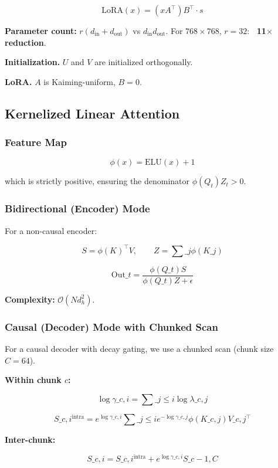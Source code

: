 \[
\text{LoRA}(x) = (x A^\top) B^\top \cdot s
\tag{4.2}
\]

\textbf{Parameter count:} $r(d_\text{in} + d_\text{out})$ vs $d_\text{in} d_\text{out}$. 
For $768 \times 768$, $r = 32$: \textbf{~11$\times$ reduction}.

\textbf{Initialization.} $U$ and $V$ are initialized orthogonally.

\textbf{LoRA.} $A$ is Kaiming-uniform, $B = 0$.

\subsection{Kernelized Linear Attention}

\subsubsection{Feature Map}

\[
\phi(x) = \text{ELU}(x) + 1
\tag{4.3}
\]

which is strictly positive, ensuring the denominator $\phi(Q_t) Z_t > 0$.

\subsubsection{Bidirectional (Encoder) Mode}

For a non-causal encoder:

\[
S = \phi(K)^\top V, \qquad
Z = \sum\_j \phi(K\_j)
\tag{4.4}
\]

\[
\text{Out}\_t = \frac{\phi(Q\_t) S}{\phi(Q\_t) Z + \epsilon}
\tag{4.5}
\]

\textbf{Complexity:} $\mathcal{O}(N d_h^2)$.

\subsubsection{Causal (Decoder) Mode with Chunked Scan}

For a causal decoder with decay gating, we use a chunked scan (chunk size $C = 64$).

\textbf{Within chunk $c$:}

\[
\log \gamma\_{c, i} = \sum\_{j \leq i} \log \lambda\_{c, j}
\tag{4.6}
\]

\[
S\_{c, i}^{\text{intra}} = e^{\log \gamma\_{c, i}} \sum\_{j \leq i} e^{-\log \gamma\_{c, j}} \phi(K\_{c, j}) V\_{c, j}^\top
\tag{4.7}
\]

\textbf{Inter-chunk:}

\[
S\_{c, i} = S\_{c, i}^{\text{intra}} + e^{\log \gamma\_{c, i}} S\_{c-1, C}
\tag{4.8}
\]

